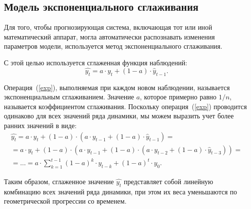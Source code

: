 \documentclass[a4paper,14pt, unknownkeysallowed]{extreport}
\begin{document}
	\subsection*{Модель экспоненциального сглаживания}
	
	Для того, чтобы прогнозирующая система, включающая тот или иной математический аппарат, могла автоматически распознавать изменения параметров модели, используется метод экспоненциального сглаживания.
	
	С этой целью используется сглаженная функция наблюдений:
	\begin{equation}
		\label{exp}
		\hat{y_t} = a \cdot y_t + (1 - a) \cdot \widehat{y}_{t-1}.
	\end{equation}
	
	Операция~(\ref{exp}), выполняемая при каждом новом наблюдении, называется экспоненциальным сглаживанием. Значение $a$, которое примерно равно $1/n$, называется коэффициентом сглаживания. Поскольку операция~(\ref{exp}) проводится одинаково для всех значений ряда динамики, мы можем выразить учет более ранних значений в виде:
	\begin{multline}
		\label{exp1}
		\hat{y_t} = a \cdot y_t + (1 - a) \cdot (a \cdot y_{t-1} + (1 - a) \cdot \widehat{y}_{t-1}) =\\
		= a \cdot y_t + (1 - a) \cdot (a \cdot y_{t-1} + (1 - a) \cdot(a \cdot y_{t-2} + (1 - a) \cdot \widehat{y}_{t-3})) =\\
		= \dots = a \cdot \sum_{k=1}^{t-1}(1-a)^k \cdot y_{t-k} + (1-a)^t \cdot y_0.
	\end{multline}
	
	Таким образом, сглаженное значение $\hat{y_t}$ представляет собой линейную комбинацию всех значений ряда динамики, при этом их веса уменьшаются по геометрической прогрессии со временем.
	
	\newpage
	
\end{document}
